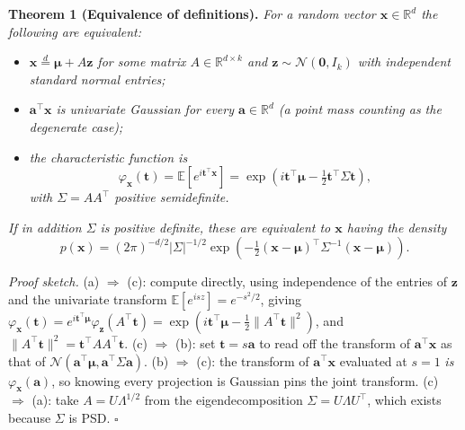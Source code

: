 \documentclass[conference]{IEEEtran}
\begin{document}
\medskip
\noindent\textbf{Theorem 1 (Equivalence of definitions).}
\textit{For a random vector $\mathbf{x} \in \mathbb{R}^d$ the following are equivalent:}
\begin{itemize}
    \item[(a)] \textit{$\mathbf{x} \stackrel{d}{=} \boldsymbol{\mu} + A\mathbf{z}$ for some matrix $A \in \mathbb{R}^{d \times k}$ and $\mathbf{z} \sim \mathcal{N}(\mathbf{0}, I_k)$ with independent standard normal entries;}
    \item[(b)] \textit{$\mathbf{a}^{\!\top}\mathbf{x}$ is univariate Gaussian for every $\mathbf{a} \in \mathbb{R}^d$ (a point mass counting as the degenerate case);}
    \item[(c)] \textit{the characteristic function is}
    \begin{equation}
        \varphi_{\mathbf{x}}(\mathbf{t}) = \mathbb{E}\!\left[e^{i\mathbf{t}^{\!\top}\mathbf{x}}\right]
        = \exp\!\left(i\mathbf{t}^{\!\top}\boldsymbol{\mu} - \tfrac{1}{2}\mathbf{t}^{\!\top}\Sigma\mathbf{t}\right),
    \end{equation}
    \textit{with $\Sigma = AA^{\!\top}$ positive semidefinite.}
\end{itemize}
\textit{If in addition $\Sigma$ is positive definite, these are equivalent to $\mathbf{x}$ having the density}
\begin{equation}
    p(\mathbf{x}) = (2\pi)^{-d/2}|\Sigma|^{-1/2}
    \exp\!\left(-\tfrac{1}{2}(\mathbf{x}-\boldsymbol{\mu})^{\!\top}\Sigma^{-1}(\mathbf{x}-\boldsymbol{\mu})\right).
\end{equation}

\medskip
\textit{Proof sketch.} (a) $\Rightarrow$ (c): compute directly, using independence of the entries of $\mathbf{z}$ and the univariate transform $\mathbb{E}[e^{isz}] = e^{-s^2/2}$, giving
$\varphi_{\mathbf{x}}(\mathbf{t}) = e^{i\mathbf{t}^{\!\top}\boldsymbol{\mu}}\varphi_{\mathbf{z}}(A^{\!\top}\mathbf{t}) = \exp(i\mathbf{t}^{\!\top}\boldsymbol{\mu} - \tfrac{1}{2}\|A^{\!\top}\mathbf{t}\|^2)$, and $\|A^{\!\top}\mathbf{t}\|^2 = \mathbf{t}^{\!\top}AA^{\!\top}\mathbf{t}$. (c) $\Rightarrow$ (b): set $\mathbf{t} = s\mathbf{a}$ to read off the transform of $\mathbf{a}^{\!\top}\mathbf{x}$ as that of $\mathcal{N}(\mathbf{a}^{\!\top}\boldsymbol{\mu}, \mathbf{a}^{\!\top}\Sigma\mathbf{a})$. (b) $\Rightarrow$ (c): the transform of $\mathbf{a}^{\!\top}\mathbf{x}$ evaluated at $s=1$ \textit{is} $\varphi_{\mathbf{x}}(\mathbf{a})$, so knowing every projection is Gaussian pins the joint transform. (c) $\Rightarrow$ (a): take $A = U\Lambda^{1/2}$ from the eigendecomposition $\Sigma = U\Lambda U^{\!\top}$, which exists because $\Sigma$ is PSD. $\square$
\end{document}
